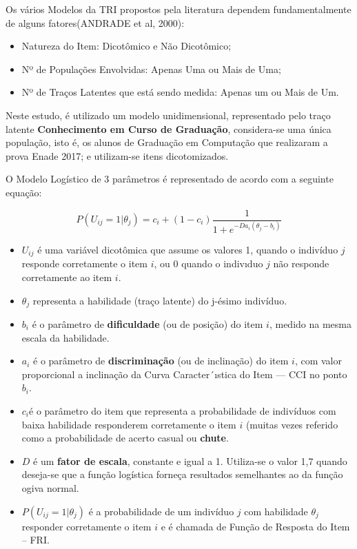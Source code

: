\documentclass[12pt]{article}
\begin{document}
Os vários Modelos da TRI propostos pela literatura dependem fundamentalmente de alguns fatores(ANDRADE et al, 2000):\vskip0.3cm

\begin{itemize}
\item Natureza do Item: Dicotômico e Não Dicotômico;
\item Nº de Populações Envolvidas: Apenas Uma ou Mais de Uma;
\item Nº de Traços Latentes que está sendo medida: Apenas um ou Mais de Um.
\end{itemize}


Neste estudo, é utilizado um modelo unidimensional, representado pelo traço latente \textbf{Conhecimento em Curso de Graduação}, considera-se uma única população, isto é, os alunos de Graduação em Computação que realizaram a prova Enade 2017; e utilizam-se itens dicotomizados.\vskip0.3cm


\newpage

O Modelo Logístico de 3 parâmetros é representado de acordo com a seguinte equação:

\begin{equation}
    P(U_{ij}=1|\theta_{j})= c_{i}+(1-c_{i})\frac{1}{1+e^{-Da_{i}(\theta_{j}-b_{i})}}
\end{equation}
\vskip0.3cm

\begin{itemize}
\item $U_{ij}$ é uma variável dicotômica que assume os valores 1, quando o indivíduo $j$ responde corretamente o item $i$, ou 0 quando o indivıduo $j$ não responde
corretamente ao item $i$.
\item $\theta_{j}$ representa a habilidade (traço latente) do j-ésimo indivíduo.
\item $b_{i}$ é o parâmetro de \textbf{dificuldade} (ou de posição) do item $i$, medido na mesma
escala da habilidade.
\item $a_{i}$ é o parâmetro de \textbf{discriminação} (ou de inclinação) do item $i$, com valor
proporcional a inclinação da Curva Caracter´ıstica do Item — CCI no
ponto $b_{i}$.
\item $c_{i} $é o parâmetro do item que representa a probabilidade de indivíduos
com baixa habilidade responderem corretamente o item $i$ (muitas vezes
referido como a probabilidade de acerto casual ou \textbf{chute}.
\item $D$ é um \textbf{fator de escala}, constante e igual a 1. Utiliza-se o valor 1,7 quando deseja-se que a função logística forneça resultados semelhantes ao da
função ogiva normal.
\item $P(U_{ij}=1|\theta_{j})$ é a probabilidade de um indivíduo $j$ com habilidade $\theta_{j}$ responder corretamente o item $i$ e é chamada de Função de Resposta do Item – FRI.
\end{itemize}
\end{document}
